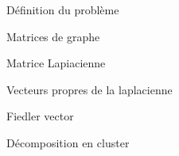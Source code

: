 \begin{frame}{Définition du problème}
\end{frame}

\begin{frame}{Matrices de graphe}
\end{frame}

\begin{frame}{Matrice Lapiacienne}
\end{frame}

\begin{frame}{Vecteurs propres de la laplacienne}
\end{frame}

\begin{frame}{Fiedler vector}
\end{frame}

\begin{frame}{Décomposition en cluster}
\end{frame}